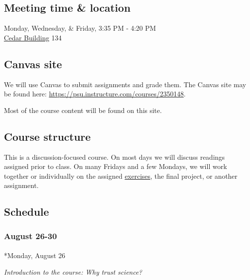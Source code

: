 \documentclass[
  letterpaper,
  DIV=11,
  numbers=noendperiod]{scrartcl}
\makeatletter
\let\oldparagraph\paragraph
\renewcommand{\paragraph}{
    \@ifstar
      \xxxParagraphStar
      \xxxParagraphNoStar
  }
\newcommand{\xxxParagraphStar}[1]{\oldparagraph*{#1}\mbox{}}
\newcommand{\xxxParagraphNoStar}[1]{\oldparagraph{#1}\mbox{}}
\makeatother
\begin{document}
\subsection*{Meeting time \& location}\label{meeting-time-location}

Monday, Wednesday, \& Friday, 3:35 PM - 4:20 PM\\
\href{https://map.psu.edu/?id=1134\#!ct/59509,33177,25403,26748,26749,26750,27255?m/357035?s/cedar}{Cedar
Building} 134

\subsection{Canvas site}\label{canvas-site}

We will use Canvas to submit assignments and grade them. The Canvas site
may be found here: \url{https://psu.instructure.com/courses/2350148}.

Most of the course content will be found on this site.

\subsection{Course structure}\label{course-structure}

This is a discussion-focused course. On most days we will discuss
readings assigned prior to class. On many Fridays and a few Mondays, we
will work together or individually on the assigned
\href{index.qmd\#exercises}{exercises}, the final project, or another
assignment.

\subsection{Schedule}\label{schedule}

\subsubsection*{August 26-30}\label{week-01}

\paragraph*{Monday, August 26}\label{monday-august-26}

\emph{Introduction to the course: Why trust science?}
\end{document}
